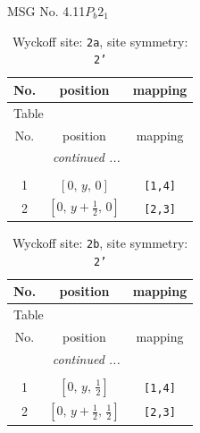 \documentclass[fleqn,8pt]{jsarticle}
\begin{document}
\setcounter{MaxMatrixCols}{32}

\renewcommand{\tablename}{Table~}
\renewcommand{\figurename}{Figure~}
\begin{center}
\LARGE
MSG No. 4.11\quad$P_{b}2_{1}$
\end{center}
\renewcommand{\arraystretch}{1.2}
\begin{longtable}{ccc}
\caption{Wyckoff site: {\tt 2a}, site symmetry: {\tt 2'}}
 \\
 \hline \hline
No. & position & mapping \\ \hline \endfirsthead

\multicolumn{2}{l}{\tablename\ \thetable{}} \\
 \hline \hline
No. & position & mapping \\ \hline \endhead

 \hline \hline
\multicolumn{2}{r}{\footnotesize\it continued ...} \\ \endfoot

 \hline \hline
\multicolumn{2}{r}{} \\ \endlastfoot

1 & $\left[ 0,\, y,\, 0 \right]$ & {\tt [1,4]} \\ \hline
2 & $\left[ 0,\, y + \frac{1}{2},\, 0 \right]$ & {\tt [2,3]} \\
\end{longtable}
\renewcommand{\arraystretch}{1.2}
\begin{longtable}{ccc}
\caption{Wyckoff site: {\tt 2b}, site symmetry: {\tt 2'}}
 \\
 \hline \hline
No. & position & mapping \\ \hline \endfirsthead

\multicolumn{2}{l}{\tablename\ \thetable{}} \\
 \hline \hline
No. & position & mapping \\ \hline \endhead

 \hline \hline
\multicolumn{2}{r}{\footnotesize\it continued ...} \\ \endfoot

 \hline \hline
\multicolumn{2}{r}{} \\ \endlastfoot

1 & $\left[ 0,\, y,\, \frac{1}{2} \right]$ & {\tt [1,4]} \\ \hline
2 & $\left[ 0,\, y + \frac{1}{2},\, \frac{1}{2} \right]$ & {\tt [2,3]} \\
\end{longtable}
\renewcommand{\arraystretch}{1.2}
\end{document}
